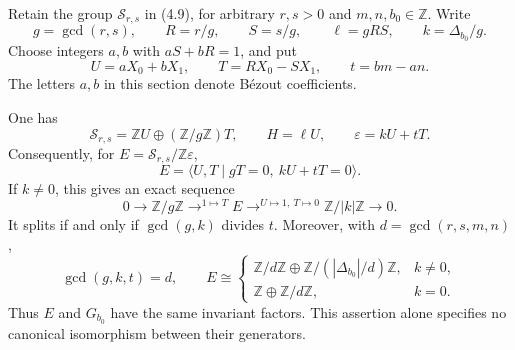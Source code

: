 \documentclass[11pt]{article}
\numberwithin{equation}{section}
\begin{document}
Retain the group $\mathcal S_{r,s}$ in (4.9), for arbitrary $r,s>0$ and
$m,n,b_0\in\mathbb Z$.  Write
\[
 g=\gcd(r,s),\qquad R=r/g,\qquad S=s/g,\qquad
 \ell=gRS,\qquad k=\Delta_{b_0}/g.
\]
Choose integers $a,b$ with $aS+bR=1$, and put
\begin{equation}\label{eq:seifert-split}
 U=aX_0+bX_1,\qquad T=RX_0-SX_1,\qquad t=bm-an.
\end{equation}
The letters $a,b$ in this section denote B\'ezout coefficients.

\begin{theorem}\label{thm:extension}
One has
\begin{equation}\label{eq:class-coordinates}
 \mathcal S_{r,s}=\mathbb ZU\oplus(\mathbb Z/g\mathbb Z)T,
 \qquad H=\ell U,\qquad \varepsilon=kU+tT.
\end{equation}
Consequently, for $E=\mathcal S_{r,s}/\mathbb Z\varepsilon$,
\begin{equation}\label{eq:extension-presentation}
 E=\langle U,T\mid gT=0,\ kU+tT=0\rangle.
\end{equation}
If $k\ne0$, this gives an exact sequence
\begin{equation}\label{eq:extension-sequence}
 0\longrightarrow\mathbb Z/g\mathbb Z
 \mathrel{\mathop{\longrightarrow}^{1\mapsto T}}E
 \mathrel{\mathop{\longrightarrow}^{U\mapsto1,\ T\mapsto0}}
 \mathbb Z/|k|\mathbb Z\longrightarrow0.
\end{equation}
It splits if and only if $\gcd(g,k)$ divides $t$.
Moreover, with $d=\gcd(r,s,m,n)$,
\[
 \gcd(g,k,t)=d,\qquad
 E\cong
 \begin{cases}
 \mathbb Z/d\mathbb Z\oplus\mathbb Z/(|\Delta_{b_0}|/d)\mathbb Z,
       &k\ne0,\\
 \mathbb Z\oplus\mathbb Z/d\mathbb Z,&k=0.
 \end{cases}
\]
Thus $E$ and $G_{b_0}$ have the same invariant factors.
This assertion alone specifies no canonical isomorphism between their generators.
\end{theorem}
\end{document}
